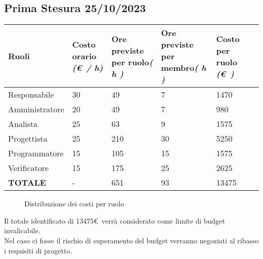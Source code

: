 \subsection{Prima Stesura 25/10/2023}
\begin{center}

    \begin{tabular}{|C{3cm}|C{2cm}|C{2cm}|C{2cm}|C{2cm}|C{2cm}|}
        \hline 

        \textbf{Ruoli} & \textbf{Costo orario} \linebreak \textit{(\euro\ / h)} & \textbf{Ore previste per ruolo}\linebreak \textit{( h )} & \textbf{Ore previste per membro}\linebreak \textit{( h )} & \textbf{Costo per ruolo} \linebreak \textit{(\euro\ )} \\
        \hline\hline

        Responsabile & 30 & 49 & 7 & 1470\\
        \hline
        Amministratore  & 20 & 49 & 7 & 980\\
        \hline
        Analista & 25 & 63 & 9 & 1575\\
        \hline
        Progettista & 25 & 210 & 30 & 5250\\
        \hline
        Programmatore & 15 & 105 & 15 & 1575\\
        \hline
        Verificatore & 15 & 175 & 25 & 2625\\
        \hline\hline

        \textbf{TOTALE} & - & 651 & 93 & 13475\\
        \hline
    \end{tabular}
\end{center}

\begin{figure}[ht]
    \centering
    \caption{Distribuzione dei costi per ruolo}
\end{figure}

Il totale identificato di 13475\euro\ verrà considerato come limite di budget invalicabile. \\
Nel caso ci fosse il rischio di superamento del budget verranno negoziati al ribasso i requisiti
di progetto. 